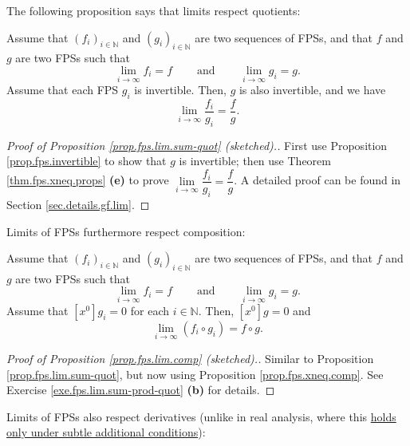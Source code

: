 The following proposition says that limits respect quotients:

\begin{proposition}
\label{prop.fps.lim.sum-quot}Assume that $\left(  f_{i}\right)  _{i\in
\mathbb{N}}$ and $\left(  g_{i}\right)  _{i\in\mathbb{N}}$ are two sequences
of FPSs, and that $f$ and $g$ are two FPSs such that%
\[
\lim\limits_{i\rightarrow\infty}f_{i}=f\ \ \ \ \ \ \ \ \ \ \text{and}%
\ \ \ \ \ \ \ \ \ \ \lim\limits_{i\rightarrow\infty}g_{i}=g.
\]
Assume that each FPS $g_{i}$ is invertible. Then, $g$ is also invertible, and
we have%
\[
\lim\limits_{i\rightarrow\infty}\dfrac{f_{i}}{g_{i}}=\dfrac{f}{g}.
\]

\end{proposition}

\begin{proof}
[Proof of Proposition \ref{prop.fps.lim.sum-quot} (sketched).]First use
Proposition \ref{prop.fps.invertible} to show that $g$ is invertible; then use
Theorem \ref{thm.fps.xneq.props} \textbf{(e)} to prove $\lim
\limits_{i\rightarrow\infty}\dfrac{f_{i}}{g_{i}}=\dfrac{f}{g}$. A detailed
proof can be found in Section \ref{sec.details.gf.lim}.
\end{proof}

Limits of FPSs furthermore respect composition:

\begin{proposition}
\label{prop.fps.lim.comp}Assume that $\left(  f_{i}\right)  _{i\in\mathbb{N}}$
and $\left(  g_{i}\right)  _{i\in\mathbb{N}}$ are two sequences of FPSs, and
that $f$ and $g$ are two FPSs such that%
\[
\lim\limits_{i\rightarrow\infty}f_{i}=f\ \ \ \ \ \ \ \ \ \ \text{and}%
\ \ \ \ \ \ \ \ \ \ \lim\limits_{i\rightarrow\infty}g_{i}=g.
\]
Assume that $\left[  x^{0}\right]  g_{i}=0$ for each $i\in\mathbb{N}$. Then,
$\left[  x^{0}\right]  g=0$ and%
\[
\lim\limits_{i\rightarrow\infty}\left(  f_{i}\circ g_{i}\right)  =f\circ g.
\]

\end{proposition}

\begin{proof}
[Proof of Proposition \ref{prop.fps.lim.comp} (sketched).]Similar to
Proposition \ref{prop.fps.lim.sum-quot}, but now using Proposition
\ref{prop.fps.xneq.comp}. See Exercise \ref{exe.fps.lim.sum-prod-quot}
\textbf{(b)} for details.
\end{proof}

Limits of FPSs also respect derivatives (unlike in real analysis, where this
\href{https://en.wikipedia.org/wiki/Uniform_convergence#To_differentiability}{holds
only under subtle additional conditions}):

